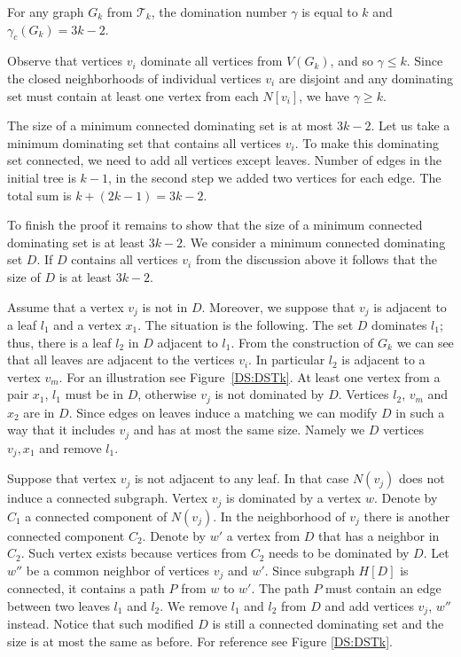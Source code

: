 \begin{obs}\label{ds:7}
	For any graph \(G_k\) from \(\mathcal{T}_k\), the domination number \(\gamma\) is equal to \(k\)
	and \(\gamma_c(G_k) = 3k - 2\).
\end{obs}
\begin{myproof}
Observe that vertices \(v_i\) dominate all vertices from \(V(G_k)\), and so \(\gamma \leq k\).
Since the closed neighborhoods of individual vertices \(v_i\) are disjoint and any dominating set must
contain at least one vertex from each \(N[v_i]\), we have \(\gamma \geq k\).

The size of a minimum connected dominating set is at most \(3k-2\). 
Let us take a minimum dominating set that contains all vertices \(v_i\).
To make this dominating set connected, we need to add all vertices except leaves.
Number of edges in the initial tree is \(k - 1\), in the second step we added two vertices for each edge.
The total sum is \(k + (2k - 1) = 3k - 2\).

To finish the proof it remains to show that the size of a minimum connected dominating set is at least \(3k - 2\).
We consider a minimum connected dominating set \(D\).
If \(D\) contains all vertices \(v_i\) from the discussion above it follows that the size of \(D\) is at least \(3k-2\).

Assume that a vertex \(v_j\) is not in \(D\).
Moreover, we  suppose that \(v_j\) is adjacent to a leaf \(l_1\) and a vertex \(x_1\).
The situation is the following. 
The set \(D\) dominates \(l_1\); thus, there is a leaf \(l_2\) in \(D\) adjacent to \(l_1\).
From the construction of \(G_k\) we can see that all leaves are adjacent to the vertices \(v_i\).
In particular \(l_2\) is adjacent to a vertex \(v_m\). For an illustration see Figure~\ref{DS:DSTk}.
At least one vertex from a pair \(x_1\), \(l_1\) must be in \(D\), otherwise \(v_j\) is not dominated by \(D\).
Vertices \(l_2\), \(v_m\) and \(x_2\) are in \(D\).
Since edges on leaves induce a matching we can modify \(D\) in such a way that it includes \(v_j\)
and has at most the same size. Namely we \(D\) vertices \(v_j, x_1\) and remove \(l_1\).

Suppose that vertex \(v_j\) is not adjacent to any leaf.
In that case \(N(v_j)\) does not induce a connected subgraph.
Vertex \(v_j\) is dominated by a vertex \(w\). 
Denote by \(C_1\) a connected component of \(N(v_j)\).
In the neighborhood of \(v_j\) there is another connected component \(C_2\).
Denote by \(w'\) a vertex from \(D\) that has a neighbor in \(C_2\).
Such vertex exists because vertices from \(C_2\) needs to be dominated by \(D\).
Let \(w''\) be a common neighbor of vertices \(v_j\) and \(w'\).
Since subgraph \(H[D]\) is connected, it contains a path \(P\) from \(w\) to \(w'\).
The path \(P\) must contain an edge between two leaves \(l_1\) and \(l_2\).
We remove \(l_1\) and \(l_2\) from \(D\) and add vertices \(v_j\), \(w''\) instead.
Notice that such modified \(D\) is still a connected dominating set and
the size is at most the same as before.
For reference see Figure \ref{DS:DSTk}.
\end{myproof}

